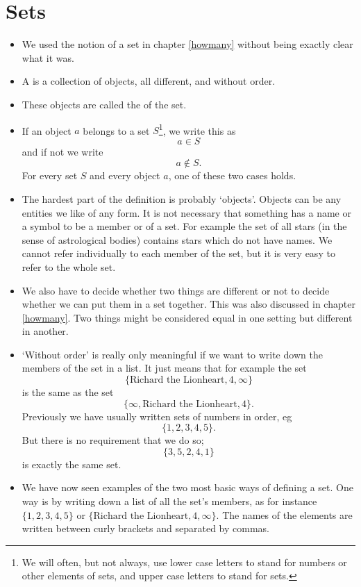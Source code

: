 \chapter{Sets}
\label{sets}

\begin{itemize}
\item
We used the notion of a set in chapter \ref{howmany} without being exactly clear what it was.
\item
A  is a collection of objects, all different, and without order.
\item
These objects are called the  of the set.
\item
If an object $a$ belongs to a set $S$\footnote{We will often, but not always, use lower case letters to stand for numbers or other elements of sets, and upper case letters to stand for sets.}, we write this as 
\[ a \in S \]
and if not we write
\[ a \notin S .\]
For every set $S$ and every object $a$, one of these two cases holds.
\item
The hardest part of the definition is probably `objects'. Objects can be any entities we like of any form. It is not necessary that something has a name or a symbol to be a member or  of a set. For example the set of all stars (in the sense of astrological bodies) contains stars which do not have names. We cannot refer individually to each member of the set, but it is very easy to refer to the whole set.
\item
We also have to decide whether two things are different or not to decide whether we can put them in a set together. This was also discussed in chapter \ref{howmany}. Two things might be considered equal in one setting but different in another.
\item
`Without order' is really only meaningful if we want to write down the members of the set in a list. It just means that for example the set
\[ \{\text{Richard the Lionheart}, 4, \infty \} \]
is the same as the set 
\[ \{\infty, \text{Richard the Lionheart}, 4\}. \]
Previously we have usually written sets of numbers in order, eg 
\[ \{1, 2, 3, 4, 5\} .\]
But there is no requirement that we do so; 
\[ \{3, 5, 2, 4, 1\} \]
is exactly the same set.
\item
We have now seen examples of the two most basic ways of defining a set.
One way is by writing down a list of all the set's members, as for instance $\{1,2,3,4,5\}$ or $\{\text{Richard the Lionheart}, 4, \infty\}$. The names of the elements are written between curly brackets and separated by commas.

\end{itemize}
